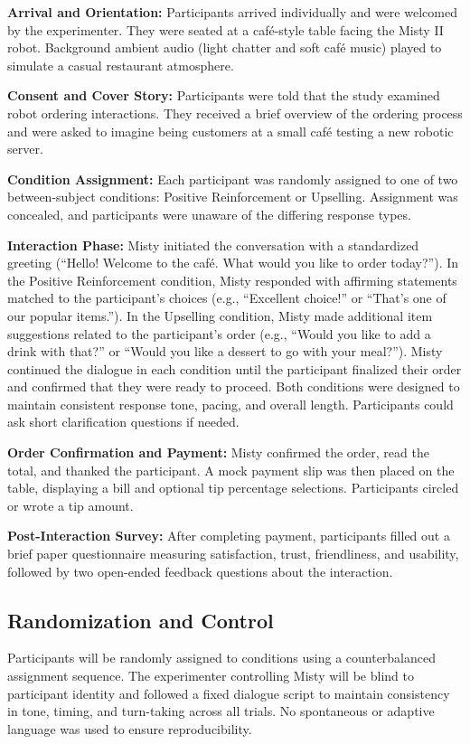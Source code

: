 \documentclass[conference]{IEEEtran}
\begin{document}
\textbf{Arrival and Orientation:} Participants arrived individually and were welcomed by the experimenter. They were seated at a café-style table facing the Misty II robot. Background ambient audio (light chatter and soft café music) played to simulate a casual restaurant atmosphere.

\textbf{Consent and Cover Story:} Participants were told that the study examined robot ordering interactions. They received a brief overview of the ordering process and were asked to imagine being customers at a small café testing a new robotic server.

\textbf{Condition Assignment:} Each participant was randomly assigned to one of two between-subject conditions: Positive Reinforcement or Upselling. Assignment was concealed, and participants were unaware of the differing response types.

\textbf{Interaction Phase:} Misty initiated the conversation with a standardized greeting (``Hello! Welcome to the café. What would you like to order today?''). In the Positive Reinforcement condition, Misty responded with affirming statements matched to the participant's choices (e.g., ``Excellent choice!'' or ``That's one of our popular items.''). In the Upselling condition, Misty made additional item suggestions related to the participant's order (e.g., ``Would you like to add a drink with that?'' or ``Would you like a dessert to go with your meal?''). Misty continued the dialogue in each condition until the participant finalized their order and confirmed that they were ready to proceed. Both conditions were designed to maintain consistent response tone, pacing, and overall length. Participants could ask short clarification questions if needed.

\textbf{Order Confirmation and Payment:} Misty confirmed the order, read the total, and thanked the participant. A mock payment slip was then placed on the table, displaying a bill and optional tip percentage selections. Participants circled or wrote a tip amount.

\textbf{Post-Interaction Survey:} After completing payment, participants filled out a brief paper questionnaire measuring satisfaction, trust, friendliness, and usability, followed by two open-ended feedback questions about the interaction.

\subsection{Randomization and Control}
Participants will be randomly assigned to conditions using a counterbalanced assignment sequence. The experimenter controlling Misty will be blind to participant identity and followed a fixed dialogue script to maintain consistency in tone, timing, and turn-taking across all trials. No spontaneous or adaptive language was used to ensure reproducibility.
\end{document}
